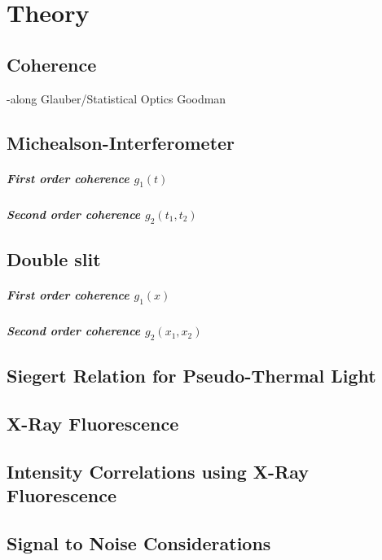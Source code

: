 \chapter{Theory}

\section{Coherence}
-along Glauber/Statistical Optics Goodman


\section{Michealson-Interferometer}
	\paragraph{First order coherence $g_1(t)$}
	\paragraph{Second order coherence $g_2(t_1,t_2)$}


\section{Double slit}
	\paragraph{First order coherence $g_1(x)$}
	\paragraph{Second order coherence $g_2(x_1,x_2)$}
\section{Siegert Relation for Pseudo-Thermal Light}

\section{X-Ray Fluorescence}

\section{Intensity Correlations using X-Ray Fluorescence}
\section{Signal to Noise Considerations}
\label{chap:theory}


